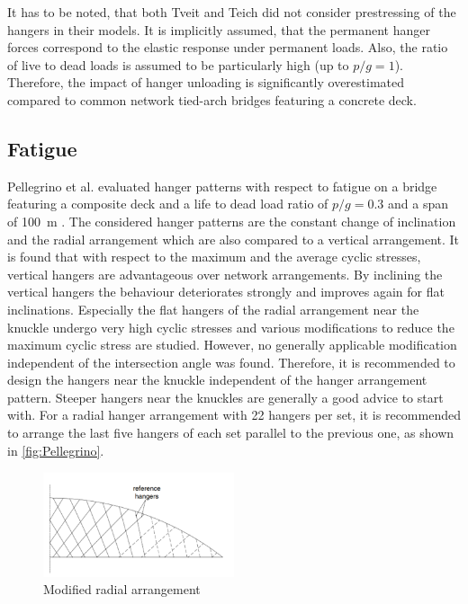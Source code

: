 It has to be noted, that both Tveit and Teich did not consider prestressing of the hangers in their models. It is implicitly assumed, that the permanent hanger forces correspond to the elastic response under permanent loads. Also, the ratio of live to dead loads is assumed to be particularly high (up to $p/g=1$). Therefore, the impact of hanger unloading is significantly overestimated compared to common network tied-arch bridges featuring a concrete deck.

\subsection{Fatigue} \label{sec:rev_fat}
Pellegrino et al. evaluated hanger patterns with respect to fatigue on a bridge featuring a composite deck and a life to dead load ratio of $p/g=0.3$ and a span of \SI{100}{m} \cite{Pellegrino}. The considered hanger patterns are the constant change of inclination and the radial arrangement which are also compared to a vertical arrangement. It is found that with respect to the maximum and the average cyclic stresses, vertical hangers are advantageous over network arrangements. By inclining the vertical hangers the behaviour deteriorates strongly and improves again for flat inclinations. Especially the flat hangers of the radial arrangement near the knuckle undergo very high cyclic stresses and various modifications to reduce the maximum cyclic stress are studied. However, no generally applicable modification independent of the intersection angle was found. Therefore, it is recommended to design the hangers near the knuckle independent of the hanger arrangement pattern. Steeper hangers near the knuckles are generally a good advice to start with. For a radial hanger arrangement with 22 hangers per set, it is recommended to arrange the last five hangers of each set parallel to the previous one, as shown in \autoref{fig:Pellegrino}.
\begin{figure}[H]
    \centering
    \includegraphics[width=0.5\textwidth]{Pictures/PellegrinoArrangement.png}
    \caption{Modified radial arrangement \cite{Pellegrino}}
    \label{fig:Pellegrino}
\end{figure}



